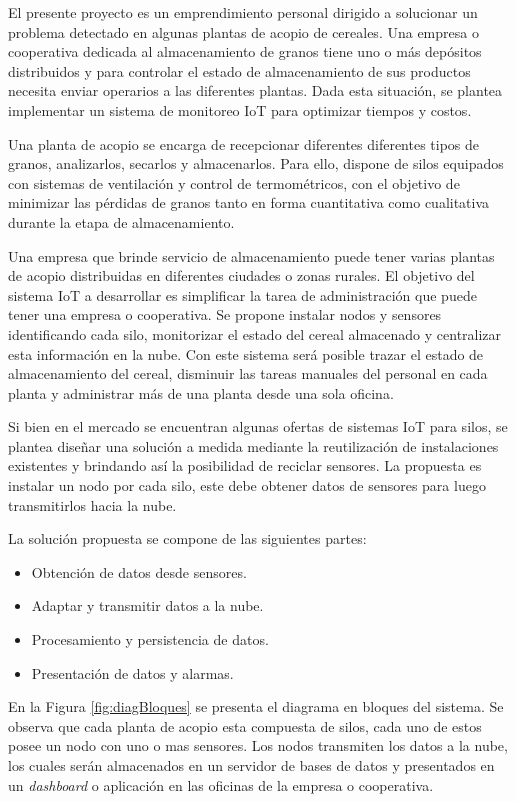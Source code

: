 \documentclass[
11pt, %
]{charter}
\begin{document}
El presente proyecto es un emprendimiento personal dirigido a solucionar un problema detectado en algunas plantas de acopio de cereales. Una empresa  o cooperativa dedicada al almacenamiento de granos tiene uno o más depósitos distribuidos y para controlar el estado de almacenamiento de sus productos necesita enviar operarios a las diferentes plantas. Dada esta situación, se plantea implementar un sistema de monitoreo IoT para optimizar tiempos y costos. 

Una planta de acopio se encarga de recepcionar diferentes diferentes tipos de granos, analizarlos, secarlos y almacenarlos. Para ello, dispone de silos equipados con sistemas de ventilación y control de termométricos, con el objetivo de minimizar las pérdidas de granos tanto en forma cuantitativa como cualitativa durante la etapa de almacenamiento. 

Una empresa que brinde servicio de almacenamiento puede tener varias plantas de acopio distribuidas en diferentes ciudades o zonas rurales. El objetivo del sistema IoT a desarrollar es simplificar la tarea de administración que puede tener una empresa o cooperativa. Se propone instalar nodos y sensores identificando cada silo, monitorizar el estado del cereal almacenado y centralizar esta información en la nube. Con este sistema será posible trazar el estado de almacenamiento del cereal, disminuir las tareas manuales del personal en cada planta y administrar más de una planta desde una sola oficina. 

Si bien en el mercado se encuentran algunas ofertas de sistemas IoT para silos, se plantea diseñar una solución a medida mediante la reutilización de instalaciones existentes y brindando así la posibilidad de reciclar sensores. La propuesta es instalar un nodo por cada silo, este debe obtener datos de sensores para luego transmitirlos hacia la nube. 

La solución propuesta se compone de las siguientes partes: 
\begin{itemize}
	\item Obtención de datos desde sensores. 
	\item Adaptar y transmitir datos a la nube.
	\item Procesamiento y persistencia de datos.
	\item Presentación de datos y alarmas. 
\end{itemize}

En la Figura \ref{fig:diagBloques} se presenta el diagrama en bloques del sistema. Se observa que cada planta de acopio esta compuesta de silos, cada uno de estos posee un nodo con uno o mas sensores. Los nodos transmiten los datos a la nube, los cuales serán almacenados en un servidor de bases de datos y presentados en un \textit{dashboard} o aplicación en las oficinas de la empresa o cooperativa.
\end{document}
